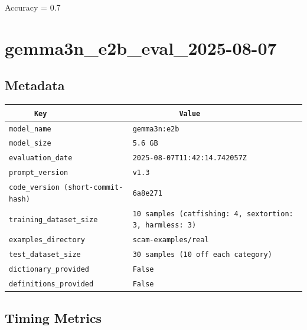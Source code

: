 \documentclass{article}
\begin{document}
\begin{center}
Accuracy = 0.7
\end{center}

\section{gemma3n\_e2b\_eval\_2025-08-07}
\subsection{Metadata}

\begin{center}
\begin{tabular}{l | l} \hline
    \verb|      Key      | & \verb|           Value           | \\ \hline
    \hline
    \verb|model_name    | & \verb|gemma3n:e2b                  | \\ \hline
    \verb|model_size    | & \verb|5.6 GB                       | \\ \hline
    \verb|evaluation_date| & \verb|2025-08-07T11:42:14.742057Z  | \\ \hline
    \verb|prompt_version| & \verb|v1.3                         | \\ \hline
    \verb|code_version (short-commit-hash)| & \verb|6a8e271                      | \\ \hline
    \verb|training_dataset_size| & \verb|10 samples (catfishing: 4, sextortion: 3, harmless: 3)| \\ \hline
    \verb|examples_directory| & \verb|scam-examples/real           | \\ \hline
    \verb|test_dataset_size| & \verb|30 samples (10 off each category)| \\ \hline
    \verb|dictionary_provided| & \verb|False                        | \\ \hline
    \verb|definitions_provided| & \verb|False                        | \\ \hline
\end{tabular}
\end{center}

\subsection{Timing Metrics}
\end{document}
